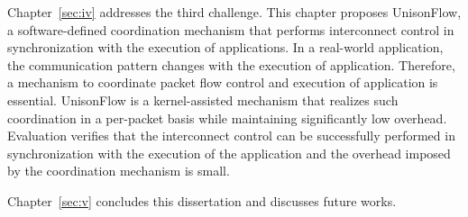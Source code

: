 Chapter~\ref{sec:iv} addresses the third challenge. This chapter proposes
UnisonFlow, a software-defined coordination mechanism that performs
interconnect control in synchronization with the execution of applications.
In a real-world application, the communication pattern changes with the
execution of application. Therefore, a mechanism to coordinate packet flow
control and execution of application is essential. UnisonFlow is a
kernel-assisted mechanism that realizes such coordination in a per-packet
basis while maintaining significantly low overhead. Evaluation verifies that the
interconnect control can be successfully performed in synchronization with the
execution of the application and the overhead imposed by the coordination
mechanism is small.

Chapter~\ref{sec:v} concludes this dissertation and discusses future works.

